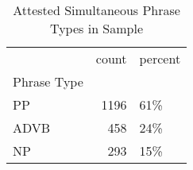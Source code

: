 \begin{table}[htbp!]
\centering
\caption{Attested Simultaneous Phrase Types in Sample}
\label{table:sim_phtype_ct}
\begin{tabular}{lrl}
\toprule
{} &  count & percent \\
Phrase Type &        &         \\
\midrule
PP          &   1196 &     61\% \\
ADVB        &    458 &     24\% \\
NP          &    293 &     15\% \\
\bottomrule
\end{tabular}
\end{table}
